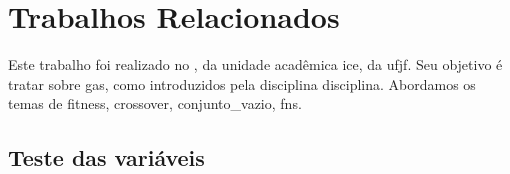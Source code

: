 \chapter{Trabalhos Relacionados}%
\label{cap:relacionados}


Este trabalho foi realizado no , da unidade acadêmica \gls{ice}, da \gls{ufjf}.
Seu objetivo é tratar sobre \glspl{ga}, como introduzidos pela disciplina \gls{disciplina}.
Abordamos os temas de \gls{fitness}, \gls{crossover}, \gls{conjunto_vazio}, \glspl{fn}.

\section{Teste das variáveis}%
\label{sec:teste_variaveis}

\testaVariaveis{}

\lipsum[1-20] %
